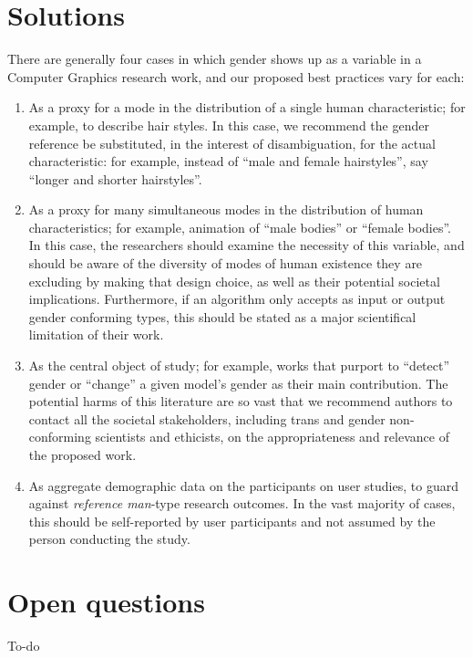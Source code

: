 \documentclass[acmtog,nonacm,review,balance=false]{acmart}
\begin{document}
\section{Solutions}

There are generally four cases in which gender shows up as a variable in a
Computer Graphics research work, and our proposed best practices vary for each:

\begin{enumerate}
  \item As a proxy for a mode in the distribution of a single human
    characteristic; for example, to describe hair styles. In this case, we
    recommend the gender reference be substituted, in the interest of
    disambiguation, for the actual characteristic: for example, instead of
    ``male and female hairstyles'', say ``longer and shorter hairstyles''.
  \item As a proxy for many simultaneous modes in the distribution of human
    characteristics; for example, animation of ``male bodies'' or ``female
    bodies''. In this case, the researchers should examine the necessity of this
    variable, and should be aware of the diversity of modes of human existence
    they are excluding by making that design choice, as well as their potential
    societal implications. Furthermore, if an algorithm only accepts as input or
    output gender conforming types, this should be stated as a major
    scientifical limitation of their work.
  \item As the central object of study; for example, works that purport to
    ``detect'' gender or ``change'' a given model's gender as their main
    contribution. The potential harms of this literature are so vast that we
    recommend authors to contact all the societal stakeholders, including trans
    and gender non-conforming scientists and ethicists, on the appropriateness
    and relevance of the proposed work. 
  \item As aggregate demographic data on the participants on user studies, to
    guard against \emph{reference man}-type research outcomes. In the vast
    majority of cases, this should be self-reported by user participants and not
    assumed by the person conducting the study.
\end{enumerate}

\section{Open questions}

To-do



\end{document}
